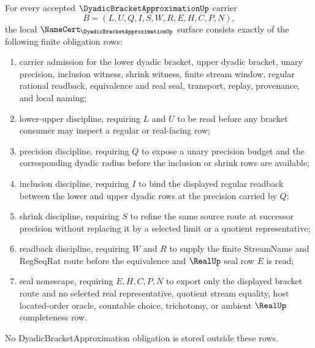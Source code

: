\begin{theorem}
\label{thm:dyadic-bracket-approximation-namecert-obligations}
For every accepted $\DyadicBracketApproximationUp$ carrier
$$
B=(L,U,Q,I,S,W,R,E,H,C,P,N),
$$
the local $\NameCert_{\DyadicBracketApproximationUp}$ surface consists exactly of the following finite obligation rows:
\begin{enumerate}
\item carrier admission for the lower dyadic bracket, upper dyadic bracket, unary precision, inclusion witness, shrink witness, finite stream window, regular rational readback, equivalence and real seal, transport, replay, provenance, and local naming;
\item lower-upper discipline, requiring $L$ and $U$ to be read before any bracket consumer may inspect a regular or real-facing row;
\item precision discipline, requiring $Q$ to expose a unary precision budget and the corresponding dyadic radius before the inclusion or shrink rows are available;
\item inclusion discipline, requiring $I$ to bind the displayed regular readback between the lower and upper dyadic rows at the precision carried by $Q$;
\item shrink discipline, requiring $S$ to refine the same source route at successor precision without replacing it by a selected limit or a quotient representative;
\item readback discipline, requiring $W$ and $R$ to supply the finite StreamName and RegSeqRat route before the equivalence and $\RealUp$ seal row $E$ is read;
\item seal nonescape, requiring $E,H,C,P,N$ to export only the displayed bracket route and no selected real representative, quotient stream equality, host located-order oracle, countable choice, trichotomy, or ambient $\RealUp$ completeness row.
\end{enumerate}
No DyadicBracketApproximation obligation is stored outside these rows.
\end{theorem}
